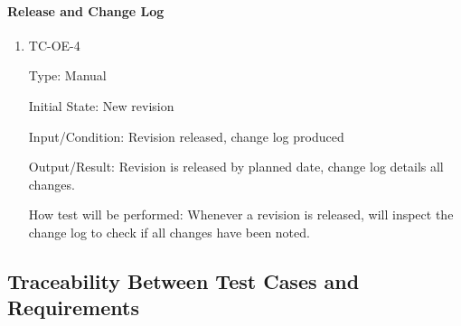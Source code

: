 \documentclass[12pt, titlepage]{article}
\begin{document}
\begin{enumerate}
\begin{enumerate}
    \end{enumerate}

    \paragraph{Release and Change Log}

    \begin{enumerate}

      \item{TC-OE-4\\}

        Type: Manual

        Initial State: New revision

        Input/Condition: Revision released, change log produced

        Output/Result: Revision is released by planned date, change log
        details all changes.

        How test will be performed: Whenever a revision is released, will
        inspect the change log to check if all changes have been noted.

    \end{enumerate}

    \subsection{Traceability Between Test Cases and Requirements}



\end{enumerate}
\end{document}
